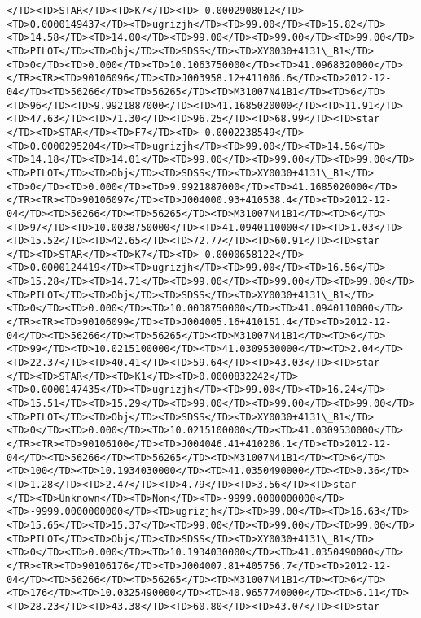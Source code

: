 \documentclass[11pt]{article}
\begin{document}
\begin{Verbatim}[commandchars=\\\{\}]
</TD><TD>STAR</TD><TD>K7</TD><TD>-0.0002908012</TD><TD>0.0000149437</TD><TD>ugrizjh</TD><TD>99.00</TD><TD>15.82</TD><TD>14.58</TD><TD>14.00</TD><TD>99.00</TD><TD>99.00</TD><TD>99.00</TD><TD>PILOT</TD><TD>Obj</TD><TD>SDSS</TD><TD>XY0030+4131\_B1</TD><TD>0</TD><TD>0.000</TD><TD>10.1063750000</TD><TD>41.0968320000</TD></TR><TR><TD>90106096</TD><TD>J003958.12+411006.6</TD><TD>2012-12-04</TD><TD>56266</TD><TD>56265</TD><TD>M31007N41B1</TD><TD>6</TD><TD>96</TD><TD>9.9921887000</TD><TD>41.1685020000</TD><TD>11.91</TD><TD>47.63</TD><TD>71.30</TD><TD>96.25</TD><TD>68.99</TD><TD>star      </TD><TD>STAR</TD><TD>F7</TD><TD>-0.0002238549</TD><TD>0.0000295204</TD><TD>ugrizjh</TD><TD>99.00</TD><TD>14.56</TD><TD>14.18</TD><TD>14.01</TD><TD>99.00</TD><TD>99.00</TD><TD>99.00</TD><TD>PILOT</TD><TD>Obj</TD><TD>SDSS</TD><TD>XY0030+4131\_B1</TD><TD>0</TD><TD>0.000</TD><TD>9.9921887000</TD><TD>41.1685020000</TD></TR><TR><TD>90106097</TD><TD>J004000.93+410538.4</TD><TD>2012-12-04</TD><TD>56266</TD><TD>56265</TD><TD>M31007N41B1</TD><TD>6</TD><TD>97</TD><TD>10.0038750000</TD><TD>41.0940110000</TD><TD>1.03</TD><TD>15.52</TD><TD>42.65</TD><TD>72.77</TD><TD>60.91</TD><TD>star      </TD><TD>STAR</TD><TD>K7</TD><TD>-0.0000658122</TD><TD>0.0000124419</TD><TD>ugrizjh</TD><TD>99.00</TD><TD>16.56</TD><TD>15.28</TD><TD>14.71</TD><TD>99.00</TD><TD>99.00</TD><TD>99.00</TD><TD>PILOT</TD><TD>Obj</TD><TD>SDSS</TD><TD>XY0030+4131\_B1</TD><TD>0</TD><TD>0.000</TD><TD>10.0038750000</TD><TD>41.0940110000</TD></TR><TR><TD>90106099</TD><TD>J004005.16+410151.4</TD><TD>2012-12-04</TD><TD>56266</TD><TD>56265</TD><TD>M31007N41B1</TD><TD>6</TD><TD>99</TD><TD>10.0215100000</TD><TD>41.0309530000</TD><TD>2.04</TD><TD>22.37</TD><TD>40.41</TD><TD>59.64</TD><TD>43.03</TD><TD>star      </TD><TD>STAR</TD><TD>K1</TD><TD>0.0000832242</TD><TD>0.0000147435</TD><TD>ugrizjh</TD><TD>99.00</TD><TD>16.24</TD><TD>15.51</TD><TD>15.29</TD><TD>99.00</TD><TD>99.00</TD><TD>99.00</TD><TD>PILOT</TD><TD>Obj</TD><TD>SDSS</TD><TD>XY0030+4131\_B1</TD><TD>0</TD><TD>0.000</TD><TD>10.0215100000</TD><TD>41.0309530000</TD></TR><TR><TD>90106100</TD><TD>J004046.41+410206.1</TD><TD>2012-12-04</TD><TD>56266</TD><TD>56265</TD><TD>M31007N41B1</TD><TD>6</TD><TD>100</TD><TD>10.1934030000</TD><TD>41.0350490000</TD><TD>0.36</TD><TD>1.28</TD><TD>2.47</TD><TD>4.79</TD><TD>3.56</TD><TD>star      </TD><TD>Unknown</TD><TD>Non</TD><TD>-9999.0000000000</TD><TD>-9999.0000000000</TD><TD>ugrizjh</TD><TD>99.00</TD><TD>16.63</TD><TD>15.65</TD><TD>15.37</TD><TD>99.00</TD><TD>99.00</TD><TD>99.00</TD><TD>PILOT</TD><TD>Obj</TD><TD>SDSS</TD><TD>XY0030+4131\_B1</TD><TD>0</TD><TD>0.000</TD><TD>10.1934030000</TD><TD>41.0350490000</TD></TR><TR><TD>90106176</TD><TD>J004007.81+405756.7</TD><TD>2012-12-04</TD><TD>56266</TD><TD>56265</TD><TD>M31007N41B1</TD><TD>6</TD><TD>176</TD><TD>10.0325490000</TD><TD>40.9657740000</TD><TD>6.11</TD><TD>28.23</TD><TD>43.38</TD><TD>60.80</TD><TD>43.07</TD><TD>star      
\end{Verbatim}
\end{document}
